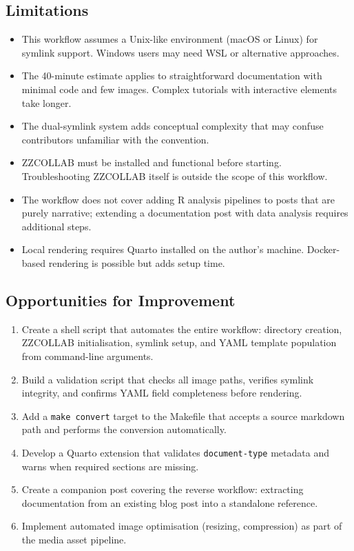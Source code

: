 \documentclass[
  letterpaper,
  DIV=11,
  numbers=noendperiod]{scrartcl}
\providecommand{\tightlist}{%
  \setlength{\itemsep}{0pt}\setlength{\parskip}{0pt}}
\begin{document}
\subsection{Limitations}\label{limitations}

\begin{itemize}
\tightlist
\item
  This workflow assumes a Unix-like environment (macOS or Linux) for
  symlink support. Windows users may need WSL or alternative approaches.
\item
  The 40-minute estimate applies to straightforward documentation with
  minimal code and few images. Complex tutorials with interactive
  elements take longer.
\item
  The dual-symlink system adds conceptual complexity that may confuse
  contributors unfamiliar with the convention.
\item
  ZZCOLLAB must be installed and functional before starting.
  Troubleshooting ZZCOLLAB itself is outside the scope of this workflow.
\item
  The workflow does not cover adding R analysis pipelines to posts that
  are purely narrative; extending a documentation post with data
  analysis requires additional steps.
\item
  Local rendering requires Quarto installed on the author's machine.
  Docker-based rendering is possible but adds setup time.
\end{itemize}

\subsection{Opportunities for
Improvement}\label{opportunities-for-improvement}

\begin{enumerate}
\def\labelenumi{\arabic{enumi}.}
\tightlist
\item
  Create a shell script that automates the entire workflow: directory
  creation, ZZCOLLAB initialisation, symlink setup, and YAML template
  population from command-line arguments.
\item
  Build a validation script that checks all image paths, verifies
  symlink integrity, and confirms YAML field completeness before
  rendering.
\item
  Add a \texttt{make\ convert} target to the Makefile that accepts a
  source markdown path and performs the conversion automatically.
\item
  Develop a Quarto extension that validates \texttt{document-type}
  metadata and warns when required sections are missing.
\item
  Create a companion post covering the reverse workflow: extracting
  documentation from an existing blog post into a standalone reference.
\item
  Implement automated image optimisation (resizing, compression) as part
  of the media asset pipeline.
\end{enumerate}
\end{document}
